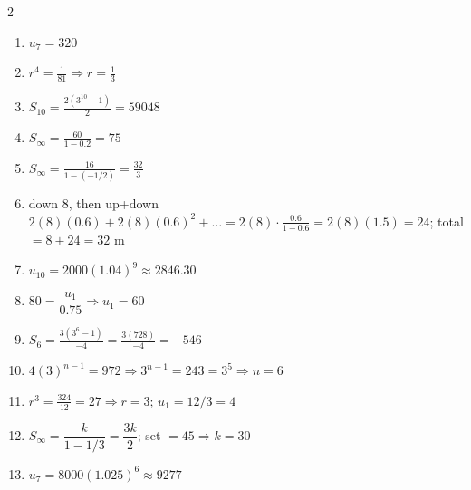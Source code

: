 \documentclass[11pt]{article}
\begin{document}
\begin{keybox}
\begin{multicols}{2}
\small
\begin{enumerate}[leftmargin=*,itemsep=3pt]
  \item $u_7=320$
  \item $r^4=\tfrac1{81}\Rightarrow r=\tfrac13$
  \item $S_{10}=\tfrac{2(3^{10}-1)}{2}=59048$
  \item $S_\infty=\tfrac{60}{1-0.2}=75$
  \item $S_\infty=\tfrac{16}{1-(-1/2)}=\tfrac{32}{3}$
  \item down 8, then up+down $2(8)(0.6)+2(8)(0.6)^2+\dots=2(8)\cdot\tfrac{0.6}{1-0.6}=2(8)(1.5)=24$; total $=8+24=32$ m
  \item $u_{10}=2000(1.04)^9\approx2846.30$
  \item $80=\dfrac{u_1}{0.75}\Rightarrow u_1=60$
  \item $S_6=\tfrac{3(3^6-1)}{-4}=\tfrac{3(728)}{-4}=-546$
  \item $4(3)^{n-1}=972\Rightarrow3^{n-1}=243=3^5\Rightarrow n=6$
  \item $r^3=\tfrac{324}{12}=27\Rightarrow r=3$; $u_1=12/3=4$
  \item $S_\infty=\dfrac{k}{1-1/3}=\dfrac{3k}{2}$; set $=45\Rightarrow k=30$
  \item $u_7=8000(1.025)^6\approx9277$
\end{enumerate}
\end{multicols}
\end{keybox}
\end{document}
